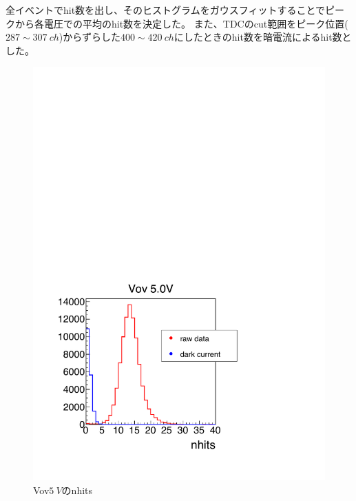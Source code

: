 \documentclass[uplatex, titlepage, dvipdfmx, 12pt, a4paper]{jsreport}
\begin{document}
    全イベントでhit数を出し、そのヒストグラムをガウスフィットすることでピークから各電圧での平均のhit数を決定した。
    また、TDCのcut範囲をピーク位置($287\sim307\:\si{ch}$)からずらした$400\sim420\:\si{ch}$にしたときのhit数を暗電流によるhit数とした。
    
    \begin{figure}[b]
      \begin{center} 
        \includegraphics[scale=0.5, clip]{image/Vov5_nhits.pdf}
        \caption{Vov$\SI{5}{V}$のnhits} 
        \label{fig:nhits} 
      \end{center}
    \end{figure}
\end{document}
